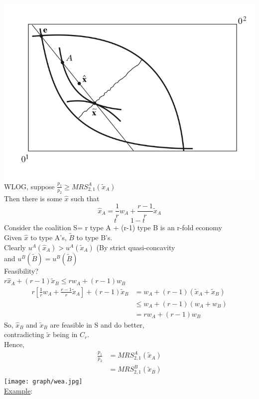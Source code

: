 \documentclass[letterpaper,13pt,single,pdftex]{scrartcl}
\begin{document}
\includegraphics[scale = 0.5]{edgeworth-debreu-scarf.png}\\
WLOG, suppose $\frac{p_1}{p_2} \ge MRS_{2,1}^A (\tilde{x}_A) $\\
Then there is some $\hat{x}$ such that 
\[\hat{x}_A = \frac{1}{r}w_A + \frac{r-1}{r}\tilde{x}_A\]
\[t \qquad 1-t\]
Consider the coalition S= r type A + (r-1) type B is an r-fold economy\\
Given $\hat{x}$ to type A's, $\tilde{B}$ to type B's. \\
Clearly $u^A(\hat{x}_A) >u^A(\tilde{x}_A)$ (By strict quasi-concavity\\
and $u^B(\tilde{B}) = u^B(\tilde{B})$\\
Feasibility?\\
$r\hat{x}_A +(r-1) \tilde{x}_B \le rw_A + (r-1) w_B$
\begin{align*}
   r[\frac{1}{r}w_A + \frac{r-1}{r}\tilde{x}_A ]+ (r-1) \tilde{x}_B &= w_A + (r-1) (\tilde{x}_A +\tilde{x}_B) \\
   &\le w_A +(r-1) (w_A +w_B) \\
   &= rw_A + (r-1)w_B
\end{align*}
So, $\hat{x}_B$ and $\tilde{x}_B$ are feasible in S and do better, \\
contradicting $\tilde{x}$ being in $C_r$.\\
Hence, 
\begin{align*}
    \frac{p_1}{p_2} &= MRS_{2,1}^A(\tilde{x}_A)\\
    &=MRS_{2,1}^B(\tilde{x}_B)
\end{align*}\texttt{[image: graph/wea.jpg]}\\
\underline{Example}: \\
\end{document}
